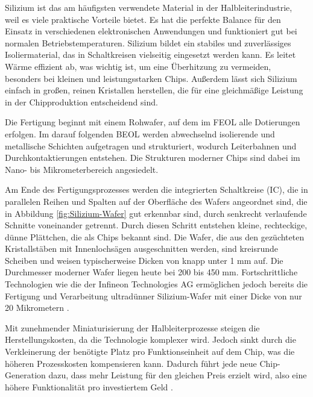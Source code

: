 Silizium ist das am häufigsten verwendete Material in der Halbleiterindustrie, weil es viele praktische Vorteile bietet. Es hat die perfekte Balance für den Einsatz in verschiedenen elektronischen Anwendungen und funktioniert gut bei normalen Betriebstemperaturen. Silizium bildet ein stabiles und zuverlässiges Isoliermaterial, das in Schaltkreisen vielseitig eingesetzt werden kann. Es leitet Wärme effizient ab, was wichtig ist, um eine Überhitzung zu vermeiden, besonders bei kleinen und leistungsstarken Chips. Außerdem lässt sich Silizium einfach in großen, reinen Kristallen herstellen, die für eine gleichmäßige Leistung in der Chipproduktion entscheidend sind.

Die Fertigung beginnt mit einem Rohwafer, auf dem im \gls{FEOL} alle Dotierungen erfolgen. Im darauf folgenden \gls{BEOL} werden abwechselnd isolierende und metallische Schichten aufgetragen und strukturiert, wodurch Leiterbahnen und Durchkontaktierungen entstehen. Die Strukturen moderner Chips sind dabei im Nano- bis Mikrometerbereich angesiedelt.

Am Ende des Fertigungsprozesses werden die integrierten Schaltkreise (\gls{IC}), die in parallelen Reihen und Spalten auf der Oberfläche des Wafers angeordnet sind, die in Abbildung \ref{fig:Silizium-Wafer} gut erkennbar sind, durch senkrecht verlaufende Schnitte voneinander getrennt. Durch diesen Schritt entstehen kleine, rechteckige, dünne Plättchen, die als Chips bekannt sind. Die Wafer, die aus den gezüchteten Kristallstäben mit Innenlochsägen ausgeschnitten werden, sind kreisrunde Scheiben und weisen typischerweise Dicken von knapp unter 1 mm auf. Die Durchmesser moderner Wafer liegen heute bei 200 bis 450 mm. Fortschrittliche Technologien wie die der Infineon Technologies AG ermöglichen jedoch bereits die Fertigung und Verarbeitung ultradünner Silizium-Wafer mit einer Dicke von nur 20 Mikrometern \cite{infineon2024dünnsterWafer}.

Mit zunehmender Miniaturisierung der Halbleiterprozesse steigen die Herstellungskosten, da die Technologie komplexer wird. Jedoch sinkt durch die Verkleinerung der benötigte Platz pro Funktionseinheit auf dem Chip, was die höheren Prozesskosten kompensieren kann. Dadurch führt jede neue Chip-Generation dazu, dass mehr Leistung für den gleichen Preis erzielt wird, also eine höhere Funktionalität pro investiertem Geld \cite{lienig2023halbleitertechnologie}.